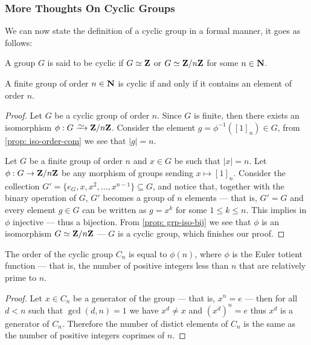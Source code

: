 \subsubsection{More Thoughts On Cyclic Groups}

We can now state the definition of a cyclic group in a formal manner, it goes as
follows:

\begin{definition}\label{def: cyclic-grp}
  A group \(G\) is said to be cyclic if \(G \simeq \mathbf{Z}\) or \(G \simeq \mathbf{Z}/n\mathbf{Z}\) for
  some \(n \in \mathbf{N}\).
\end{definition}

\begin{proposition}
  A finite group of order \(n \in \mathbf{N}\) is cyclic if and only if it contains an
  element of order \(n\).
\end{proposition}

\begin{proof}
  Let \(G\) be a cyclic group of order \(n\). Since \(G\) is finite, then there
  exists an isomorphism \(\phi: G \isoto \Z/n\Z\). Consider the element \(g =
  \phi^{-1}([1]_n) \in G\), from \cref{prop: iso-order-com} we see that \(|g| =
  n\).

  Let \(G\) be a finite group of order \(n\) and \(x \in G\) be such that \(|x|
  = n\). Let \(\phi: G \to \mathbf{Z}/n\mathbf{Z}\) be any morphism of groups sending \(x
  \mapsto [1]_n\). Consider the collection \(G' = \{e_G, x, x^2, \dots,
  x^{n-1}\} \subseteq G\), and notice that, together with the binary operation
  of \(G\), \(G'\) becomes a group of \(n\) elements --- that is, \(G' = G\) and
  every element \(g \in G\) can be written as \(g = x^k\) for some \(1 \leq k
  \leq n\). This implies in \(\phi\) injective --- thus a bijection. From
  \cref{prop: grp-iso-bij} we see that \(\phi\) is an isomorphism \(G \simeq
  \mathbf{Z}/n\mathbf{Z}\) --- \(G\) is a cyclic group, which finishes our proof.
\end{proof}

\begin{proposition}
  \label{prop:order-cyclic-totient}
  The order of the cyclic group \(C_n\) is equal to \(\phi(n)\), where \(\phi\) is the
  Euler totient function --- that is, the number of positive integers less than
  \(n\) that are relatively prime to \(n\).
\end{proposition}

\begin{proof}
  Let \(x \in C_n\) be a generator of the group --- that is, \(x^n = e\) --- then
  for all \(d < n\) such that \(\gcd(d, n) = 1\) we have \(x^d \neq x\) and
  \((x^d)^n = e\) thus \(x^d\) is a generator of \(C_n\). Therefore the number
  of distict elements of \(C_n\) is the same as the number of positive integers
  coprimes of \(n\).
\end{proof}

